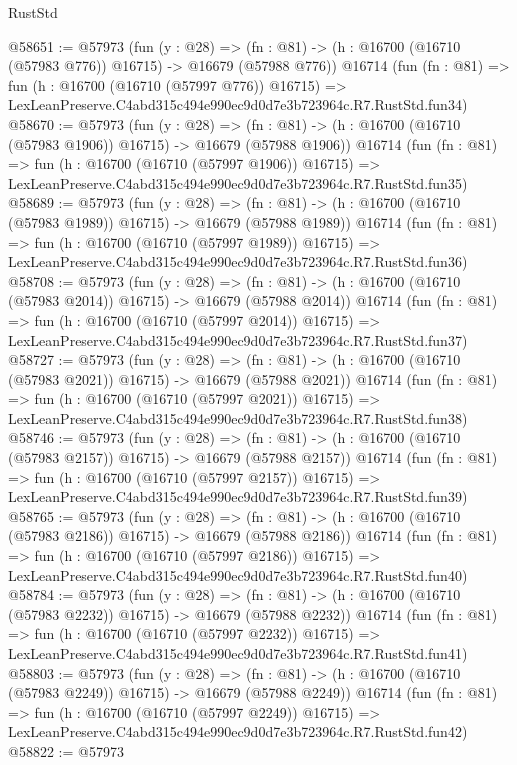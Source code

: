\begin{lexlean}{RustStd}
\begin{coremodule}
@58651 := @57973
    (fun (y : @28) =>
    (fn : @81) -> (h : @16700 (@16710 (@57983 @776)) @16715) -> @16679 (@57988 @776))
    @16714
    (fun (fn : @81) =>
    fun (h : @16700 (@16710 (@57997 @776)) @16715) =>
    LexLeanPreserve.C4abd315c494e990ec9d0d7e3b723964c.R7.RustStd.fun34)
@58670 := @57973
    (fun (y : @28) =>
    (fn : @81) -> (h : @16700 (@16710 (@57983 @1906)) @16715) -> @16679 (@57988 @1906))
    @16714
    (fun (fn : @81) =>
    fun (h : @16700 (@16710 (@57997 @1906)) @16715) =>
    LexLeanPreserve.C4abd315c494e990ec9d0d7e3b723964c.R7.RustStd.fun35)
@58689 := @57973
    (fun (y : @28) =>
    (fn : @81) -> (h : @16700 (@16710 (@57983 @1989)) @16715) -> @16679 (@57988 @1989))
    @16714
    (fun (fn : @81) =>
    fun (h : @16700 (@16710 (@57997 @1989)) @16715) =>
    LexLeanPreserve.C4abd315c494e990ec9d0d7e3b723964c.R7.RustStd.fun36)
@58708 := @57973
    (fun (y : @28) =>
    (fn : @81) -> (h : @16700 (@16710 (@57983 @2014)) @16715) -> @16679 (@57988 @2014))
    @16714
    (fun (fn : @81) =>
    fun (h : @16700 (@16710 (@57997 @2014)) @16715) =>
    LexLeanPreserve.C4abd315c494e990ec9d0d7e3b723964c.R7.RustStd.fun37)
@58727 := @57973
    (fun (y : @28) =>
    (fn : @81) -> (h : @16700 (@16710 (@57983 @2021)) @16715) -> @16679 (@57988 @2021))
    @16714
    (fun (fn : @81) =>
    fun (h : @16700 (@16710 (@57997 @2021)) @16715) =>
    LexLeanPreserve.C4abd315c494e990ec9d0d7e3b723964c.R7.RustStd.fun38)
@58746 := @57973
    (fun (y : @28) =>
    (fn : @81) -> (h : @16700 (@16710 (@57983 @2157)) @16715) -> @16679 (@57988 @2157))
    @16714
    (fun (fn : @81) =>
    fun (h : @16700 (@16710 (@57997 @2157)) @16715) =>
    LexLeanPreserve.C4abd315c494e990ec9d0d7e3b723964c.R7.RustStd.fun39)
@58765 := @57973
    (fun (y : @28) =>
    (fn : @81) -> (h : @16700 (@16710 (@57983 @2186)) @16715) -> @16679 (@57988 @2186))
    @16714
    (fun (fn : @81) =>
    fun (h : @16700 (@16710 (@57997 @2186)) @16715) =>
    LexLeanPreserve.C4abd315c494e990ec9d0d7e3b723964c.R7.RustStd.fun40)
@58784 := @57973
    (fun (y : @28) =>
    (fn : @81) -> (h : @16700 (@16710 (@57983 @2232)) @16715) -> @16679 (@57988 @2232))
    @16714
    (fun (fn : @81) =>
    fun (h : @16700 (@16710 (@57997 @2232)) @16715) =>
    LexLeanPreserve.C4abd315c494e990ec9d0d7e3b723964c.R7.RustStd.fun41)
@58803 := @57973
    (fun (y : @28) =>
    (fn : @81) -> (h : @16700 (@16710 (@57983 @2249)) @16715) -> @16679 (@57988 @2249))
    @16714
    (fun (fn : @81) =>
    fun (h : @16700 (@16710 (@57997 @2249)) @16715) =>
    LexLeanPreserve.C4abd315c494e990ec9d0d7e3b723964c.R7.RustStd.fun42)
@58822 := @57973

\end{coremodule}
\end{lexlean}
